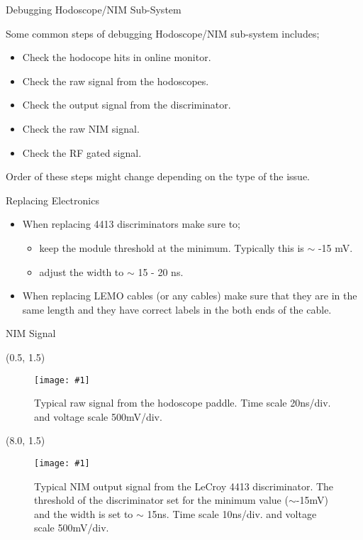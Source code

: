\documentclass[10pt, xcolor={dvipsnames}, aspectratio = 169, sans,mathserif]{beamer}
\newcommand{\leftpic}[2]
{
\begin{textblock}{7.0}(0.5, 1.5)
\begin{figure}
    \centering
    \texttt{[image: \#1]}
    \caption{#2}
\end{figure}
\end{textblock}
}
\newcommand{\rightpic}[2]
{
\begin{textblock}{7.0}(8.0, 1.5)
\begin{figure}
    \centering
    \texttt{[image: \#1]}
    \caption{#2}
\end{figure}
\end{textblock}
}
\begin{document}
\begin{frame}{Debugging Hodoscope/NIM Sub-System}

Some common steps of debugging Hodoscope/NIM sub-system includes;

\begin{itemize}

    \item Check the hodocope hits in online monitor.

    \item Check the raw signal from the hodoscopes.

    \item Check the output signal from the discriminator.

    \item Check the raw NIM signal.

    \item Check the RF gated signal.

\end{itemize}

Order of these steps might change depending on the type of the issue.

\end{frame}

\begin{frame}{Replacing Electronics}

\begin{itemize}

    \item When replacing 4413 discriminators make sure to;

    \begin{itemize}

        \item keep the module threshold at the minimum. Typically this is $\sim$ -15 mV.

        \item adjust the width to $\sim$ 15 - 20 ns. 

    \end{itemize}

    \item When replacing LEMO cables (or any cables) make sure that they are in the same length and they have correct labels in the both ends of the cable.

\end{itemize}

\end{frame}


\begin{frame}{NIM Signal}

\leftpic{signal_1.jpg}{Typical raw signal from the hodoscope paddle. Time scale 20ns/div. and voltage scale 500mV/div.}

\rightpic{signal_2.jpg}{Typical NIM output signal from the LeCroy 4413 discriminator. The threshold of the discriminator set for the minimum value ($\sim$-15mV) and the width is set to $\sim$ 15ns. Time scale 10ns/div. and voltage scale 500mV/div.}

\end{frame}
\end{document}
